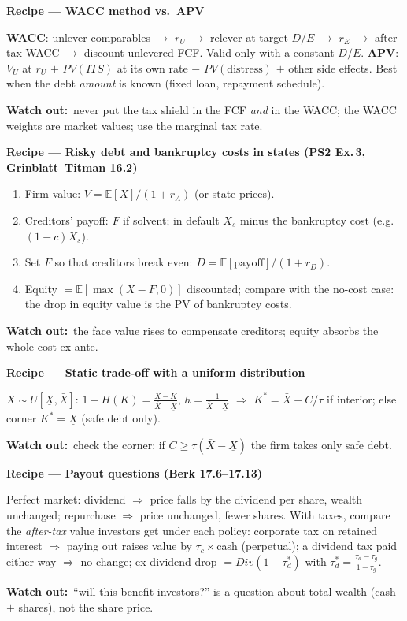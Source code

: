 \documentclass[10pt,a4paper]{article}
\newcommand{\recipe}[1]{\par\smallskip\noindent\textbf{\color{hd}Recipe --- #1}\par}
\newcommand{\watch}{\par\noindent\textbf{\color{wr}Watch out:}~}
\newcommand{\E}{\mathbb{E}}
\begin{document}
\recipe{WACC method vs.\ APV}
\textbf{WACC}: unlever comparables $\to$ $r_U$ $\to$ relever at target $D/E$ $\to$ $r_E$ $\to$
after-tax WACC $\to$ discount unlevered FCF. Valid only with a constant $D/E$.
\textbf{APV}: $V_U$ at $r_U$ $+$ $PV(ITS)$ at its own rate $-$ $PV(\text{distress})$ $+$ other side
effects. Best when the debt \emph{amount} is known (fixed loan, repayment schedule).
\watch never put the tax shield in the FCF \emph{and} in the WACC; the WACC weights are market values;
use the marginal tax rate.

\recipe{Risky debt and bankruptcy costs in states (PS2 Ex.\,3, Grinblatt--Titman 16.2)}
\begin{enumerate}
  \item Firm value: $V=\E[X]/(1+r_A)$ (or state prices).
  \item Creditors' payoff: $F$ if solvent; in default $X_s$ minus the bankruptcy cost (e.g.\ $(1-c)X_s$).
  \item Set $F$ so that creditors break even: $D=\E[\text{payoff}]/(1+r_D)$.
  \item Equity $=\E[\max(X-F,0)]$ discounted; compare with the no-cost case: the drop in equity value
        is the PV of bankruptcy costs.
\end{enumerate}
\watch the face value rises to compensate creditors; equity absorbs the whole cost ex ante.

\recipe{Static trade-off with a uniform distribution}
$X\sim U[\underline X,\bar X]$: $1-H(K)=\frac{\bar X-K}{\bar X-\underline X}$,
$h=\frac{1}{\bar X-\underline X}$ $\Rightarrow$ $K^*=\bar X-C/\tau$ if interior; else corner
$K^*=\underline X$ (safe debt only).
\watch check the corner: if $C\ge\tau(\bar X-\underline X)$ the firm takes only safe debt.

\recipe{Payout questions (Berk 17.6--17.13)}
Perfect market: dividend $\Rightarrow$ price falls by the dividend per share, wealth unchanged;
repurchase $\Rightarrow$ price unchanged, fewer shares. With taxes, compare the \emph{after-tax} value
investors get under each policy: corporate tax on retained interest $\Rightarrow$ paying out raises
value by $\tau_c\times$cash (perpetual); a dividend tax paid either way $\Rightarrow$ no change;
ex-dividend drop $=Div(1-\tau_d^*)$ with $\tau_d^*=\frac{\tau_d-\tau_g}{1-\tau_g}$.
\watch ``will this benefit investors?'' is a question about total wealth (cash $+$ shares), not the
share price.

\end{document}

